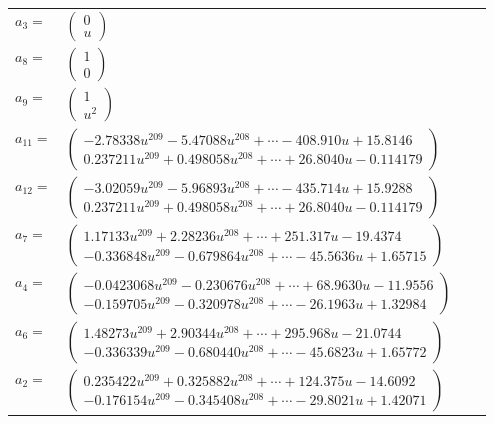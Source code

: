 \documentclass[1p]{elsarticle_modified}
\theoremstyle{definition}
\begin{document}
\begin{tabular}{m{7pt} m{180pt} m{7pt} m{180pt} }
\flushright $a_{3}=$&$\begin{pmatrix}0\\u\end{pmatrix}$ \\
\flushright $a_{8}=$&$\begin{pmatrix}1\\0\end{pmatrix}$ \\
\flushright $a_{9}=$&$\begin{pmatrix}1\\u^2\end{pmatrix}$ \\
\flushright $a_{11}=$&$\begin{pmatrix}-2.78338 u^{209}-5.47088 u^{208}+\cdots-408.910 u+15.8146\\0.237211 u^{209}+0.498058 u^{208}+\cdots+26.8040 u-0.114179\end{pmatrix}$ \\
\flushright $a_{12}=$&$\begin{pmatrix}-3.02059 u^{209}-5.96893 u^{208}+\cdots-435.714 u+15.9288\\0.237211 u^{209}+0.498058 u^{208}+\cdots+26.8040 u-0.114179\end{pmatrix}$ \\
\flushright $a_{7}=$&$\begin{pmatrix}1.17133 u^{209}+2.28236 u^{208}+\cdots+251.317 u-19.4374\\-0.336848 u^{209}-0.679864 u^{208}+\cdots-45.5636 u+1.65715\end{pmatrix}$ \\
\flushright $a_{4}=$&$\begin{pmatrix}-0.0423068 u^{209}-0.230676 u^{208}+\cdots+68.9630 u-11.9556\\-0.159705 u^{209}-0.320978 u^{208}+\cdots-26.1963 u+1.32984\end{pmatrix}$ \\
\flushright $a_{6}=$&$\begin{pmatrix}1.48273 u^{209}+2.90344 u^{208}+\cdots+295.968 u-21.0744\\-0.336339 u^{209}-0.680440 u^{208}+\cdots-45.6823 u+1.65772\end{pmatrix}$ \\
\flushright $a_{2}=$&$\begin{pmatrix}0.235422 u^{209}+0.325882 u^{208}+\cdots+124.375 u-14.6092\\-0.176154 u^{209}-0.345408 u^{208}+\cdots-29.8021 u+1.42071\end{pmatrix}$ \\

\end{tabular}
\end{document}
